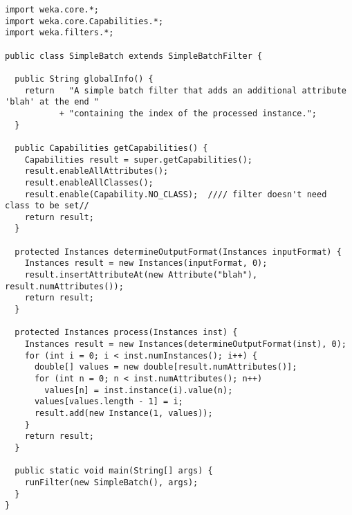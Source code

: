 
\begin{verbatim}
import weka.core.*;
import weka.core.Capabilities.*;
import weka.filters.*;

public class SimpleBatch extends SimpleBatchFilter {

  public String globalInfo() {
    return   "A simple batch filter that adds an additional attribute 'blah' at the end "
           + "containing the index of the processed instance.";
  }

  public Capabilities getCapabilities() {
    Capabilities result = super.getCapabilities();
    result.enableAllAttributes();
    result.enableAllClasses();
    result.enable(Capability.NO_CLASS);  //// filter doesn't need class to be set//
    return result;
  }

  protected Instances determineOutputFormat(Instances inputFormat) {
    Instances result = new Instances(inputFormat, 0);
    result.insertAttributeAt(new Attribute("blah"), result.numAttributes());
    return result;
  }

  protected Instances process(Instances inst) {
    Instances result = new Instances(determineOutputFormat(inst), 0);
    for (int i = 0; i < inst.numInstances(); i++) {
      double[] values = new double[result.numAttributes()];
      for (int n = 0; n < inst.numAttributes(); n++)
        values[n] = inst.instance(i).value(n);
      values[values.length - 1] = i;
      result.add(new Instance(1, values));
    }
    return result;
  }

  public static void main(String[] args) {
    runFilter(new SimpleBatch(), args);
  }
}
\end{verbatim}
